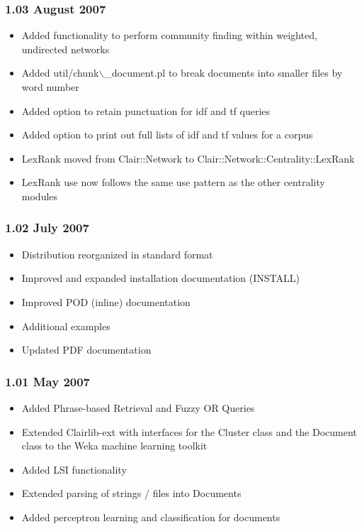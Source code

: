 \subsubsection*{1.03 August 2007\label{1_03_August_2007}}
\begin{itemize}

\item Added functionality to perform community finding within weighted, undirected networks
\item Added util/chunk$\backslash$\_document.pl to break documents into smaller files by word number
\item Added option to retain punctuation for idf and tf queries
\item Added option to print out full lists of idf and tf values for a corpus
\item LexRank moved from Clair::Network to Clair::Network::Centrality::LexRank
\item LexRank use now follows the same use pattern as the other centrality modules\end{itemize}
\subsubsection*{1.02 July 2007\label{1_02_July_2007}}
\begin{itemize}

\item Distribution reorganized in standard format
\item Improved and expanded installation documentation (INSTALL)
\item Improved POD (inline) documentation
\item Additional examples
\item Updated PDF documentation\end{itemize}
\subsubsection*{1.01 May 2007\label{1_01_May_2007}}
\begin{itemize}

\item Added Phrase-based Retrieval and Fuzzy OR Queries
\item Extended Clairlib-ext with interfaces for the Cluster class and the Document class to the Weka machine learning toolkit
\item Added LSI functionality
\item Extended parsing of strings / files into Documents
\item Added perceptron learning and classification for documents\end{itemize}
